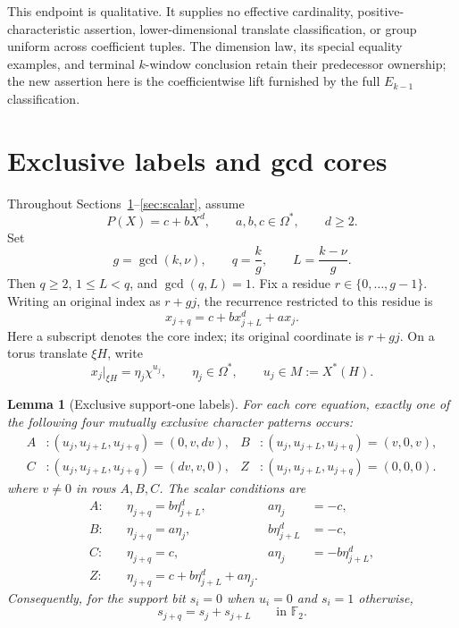 \documentclass[11pt]{article}
\newcommand{\F}{\mathbb{F}}
\newcommand{\Om}{\Omega}
\newtheorem{lemma}{Lemma}[section]
\theoremstyle{remark}
\numberwithin{equation}{section}
\begin{document}
This endpoint is qualitative.  It supplies no effective cardinality, positive-characteristic assertion, lower-dimensional translate classification, or group uniform across coefficient tuples.  The dimension law, its special equality examples, and terminal \(k\)-window conclusion retain their predecessor ownership; the new assertion here is the coefficientwise lift furnished by the full \(E_{k-1}\) classification.


\section{Exclusive labels and gcd cores}\label{sec:labels}

Throughout Sections~\ref{sec:labels}--\ref{sec:scalar}, assume
\[
 P(X)=c+bX^d,\qquad a,b,c\in\Om^\ast,\qquad d\geq2.
\]
Set
\begin{equation}\label{eq:g-q-L}
 g=\gcd(k,\nu),\qquad q=\frac{k}{g},\qquad L=\frac{k-\nu}{g}.
\end{equation}
Then \(q\geq2\), \(1\leq L<q\), and \(\gcd(q,L)=1\).  Fix a residue \(r\in\{0,\ldots,g-1\}\).  Writing an original index as \(r+gj\), the recurrence restricted to this residue is
\begin{equation}\label{eq:core-recurrence}
 x_{j+q}=c+b x_{j+L}^{d}+a x_j.
\end{equation}
Here a subscript denotes the core index; its original coordinate is \(r+gj\).  On a torus translate \(\xi H\), write
\[
 x_j|_{\xi H}=\eta_j\chi^{u_j},\qquad
 \eta_j\in\Om^\ast,\qquad u_j\in M:=X^\ast(H).
\]

\begin{lemma}[Exclusive support-one labels]\label{lem:exclusive-labels}
For each core equation, exactly one of the following four mutually exclusive character patterns occurs:
\[
 \begin{aligned}
 A&:(u_j,u_{j+L},u_{j+q})=(0,v,dv),&
 B&:(u_j,u_{j+L},u_{j+q})=(v,0,v),\\
 C&:(u_j,u_{j+L},u_{j+q})=(dv,v,0),&
 Z&:(u_j,u_{j+L},u_{j+q})=(0,0,0).
 \end{aligned}
\]
where \(v\neq0\) in rows \(A,B,C\).  The scalar conditions are
\begin{align}
 A:\quad&\eta_{j+q}=b\eta_{j+L}^{d},
          &a\eta_j&=-c, \label{eq:label-A}\\
 B:\quad&\eta_{j+q}=a\eta_j,
          &b\eta_{j+L}^{d}&=-c, \label{eq:label-B}\\
 C:\quad&\eta_{j+q}=c,
          &a\eta_j&=-b\eta_{j+L}^{d}, \label{eq:label-C}\\
 Z:\quad&\eta_{j+q}=c+b\eta_{j+L}^{d}+a\eta_j. &&
          \label{eq:label-Z}
\end{align}
Consequently, for the support bit \(s_i=0\) when \(u_i=0\) and \(s_i=1\) otherwise,
\begin{equation}\label{eq:support-recurrence}
 s_{j+q}=s_j+s_{j+L}\qquad\text{in }\F_2.
\end{equation}
\end{lemma}
\end{document}
